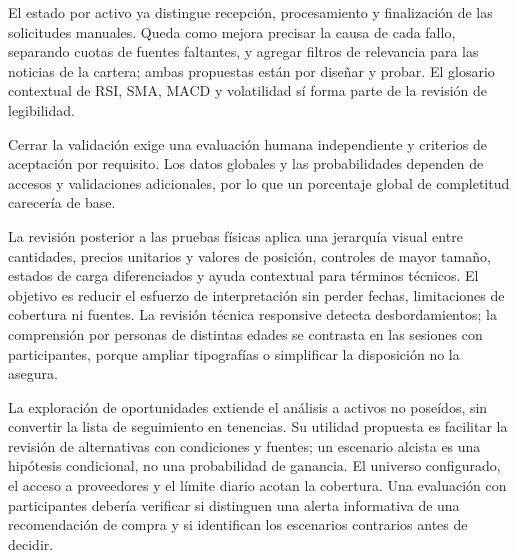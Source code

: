 El estado por activo ya distingue recepción, procesamiento y finalización de las solicitudes manuales. Queda como mejora precisar la causa de cada fallo, separando cuotas de fuentes faltantes, y agregar filtros de relevancia para las noticias de la cartera; ambas propuestas están por diseñar y probar. El glosario contextual de RSI, SMA, MACD y volatilidad sí forma parte de la revisión de legibilidad.

Cerrar la validación exige una evaluación humana independiente y criterios de aceptación por requisito. Los datos globales y las probabilidades dependen de accesos y validaciones adicionales, por lo que un porcentaje global de completitud carecería de base.

La revisión posterior a las pruebas físicas aplica una jerarquía visual entre cantidades, precios unitarios y valores de posición, controles de mayor tamaño, estados de carga diferenciados y ayuda contextual para términos técnicos. El objetivo es reducir el esfuerzo de interpretación sin perder fechas, limitaciones de cobertura ni fuentes. La revisión técnica responsive detecta desbordamientos; la comprensión por personas de distintas edades se contrasta en las sesiones con participantes, porque ampliar tipografías o simplificar la disposición no la asegura.

La exploración de oportunidades extiende el análisis a activos no poseídos, sin convertir la lista de seguimiento en tenencias. Su utilidad propuesta es facilitar la revisión de alternativas con condiciones y fuentes; un escenario alcista es una hipótesis condicional, no una probabilidad de ganancia. El universo configurado, el acceso a proveedores y el límite diario acotan la cobertura. Una evaluación con participantes debería verificar si distinguen una alerta informativa de una recomendación de compra y si identifican los escenarios contrarios antes de decidir.
